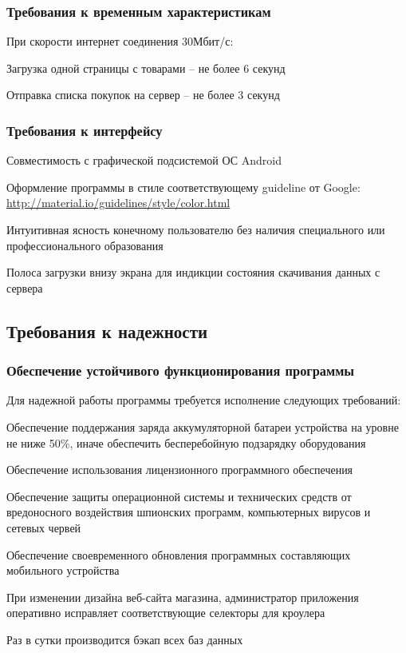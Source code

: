 \subsubsection{Требования к временным характеристикам}
При скорости интернет соединения 30Мбит/с:
\begin{my_enumerate}
\item Загрузка одной страницы с товарами -- не более 6 секунд
\item Отправка списка покупок на сервер -- не более 3 секунд
\end{my_enumerate}

\subsubsection{Требования к интерфейсу}
\begin{my_enumerate}
\item Совместимость с графической подсистемой ОС Android {\textregistered}
\item Оформление программы в стиле соответствующему guideline от Google: \url{http://material.io/guidelines/style/color.html}
\item Интуитивная ясность конечному пользователю без наличия специального или профессионального образования
\item Полоса загрузки внизу экрана для индикции состояния скачивания данных с сервера
\end{my_enumerate}

\subsection{Требования к надежности}
\subsubsection{Обеспечение устойчивого функционирования программы}

Для надежной работы программы требуется исполнение следующих требований:
\begin{my_enumerate}
\item Обеспечение поддержания заряда аккумуляторной батареи устройства на
уровне не ниже 50\%, иначе обеспечить бесперебойную подзарядку оборудования
\item Обеспечение использования лицензионного программного обеспечения
\item Обеспечение защиты операционной системы и технических средств от
вредоносного воздействия шпионских программ, компьютерных вирусов и сетевых
червей
\item Обеспечение своевременного обновления программных составляющих мобильного устройства
\item При изменении дизайна веб-сайта магазина, администратор приложения оперативно
исправляет соответствующие селекторы для кроулера
\item Раз в сутки производится бэкап всех баз данных
\end{my_enumerate}


